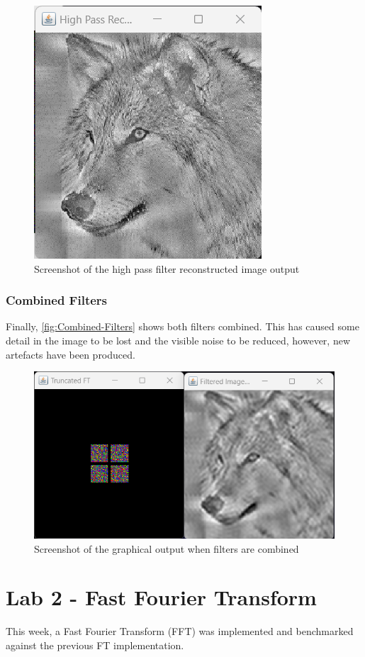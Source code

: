       \begin{figure}[H]
        \centering
        \includegraphics[width=0.49\columnwidth]{Figures/Week 1/W1-High-Pass-Reconstructed.png}
        \caption{Screenshot of the high pass filter reconstructed image output}
        \label{fig:High-Pass-Filter-Image}
      \end{figure}

      \subsubsection{Combined Filters}
      Finally, \autoref{fig:Combined-Filters} shows both filters combined. This has caused some detail in the image to be lost and the visible noise to be reduced, however, new artefacts have been produced.
        \begin{figure}[H] 
            \centering
            \includegraphics[width=0.8\columnwidth]{Figures/Week 1/W1-Both-Filters.png}
            \caption{Screenshot of the graphical output when filters are combined}
            \label{fig:Combined-Filters}
        \end{figure}



\newpage
\section{Lab 2 - Fast Fourier Transform}
This week, a Fast Fourier Transform (FFT) was implemented and benchmarked against the previous FT implementation. 

